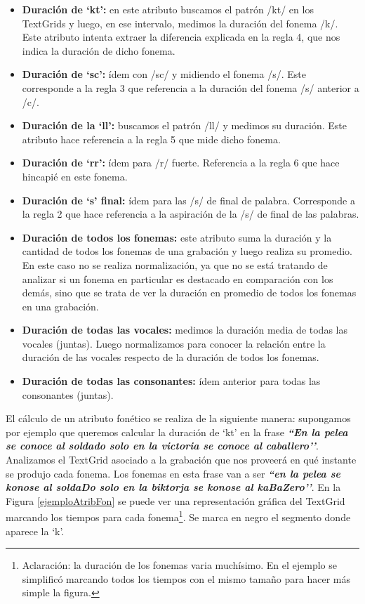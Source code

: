 \begin{itemize}
    \item \textbf{Duración de `kt’:} en este atributo buscamos el patrón /kt/ en los TextGrids y luego, en ese intervalo, medimos la duración del fonema /k/. Este atributo intenta extraer la diferencia explicada en la regla 4, que nos indica la duración de dicho fonema.
    \item \textbf{Duración de `sc’:} ídem con /sc/ y midiendo el fonema /s/. Este corresponde a la regla 3 que referencia a la duración del fonema /s/ anterior a /c/.  
    \item \textbf{Duración de la `ll’:} buscamos el patrón /ll/ y medimos su duración. Este atributo hace referencia a la regla 5 que mide dicho fonema.
    \item \textbf{Duración de `rr’:} ídem para /r/ fuerte. Referencia a la regla 6 que hace hincapié en este fonema.
    \item \textbf{Duración de `s’ final:} ídem para las /s/ de final de palabra. Corresponde a la regla 2 que hace referencia a la aspiración de la /s/ de final de las palabras.  
    \item \textbf{Duración de todos los fonemas:} este atributo suma la duración y la cantidad de todos los fonemas de una grabación y luego realiza su promedio. En este caso no se realiza normalización, ya que no se está tratando de analizar si un fonema en particular es destacado en comparación con los demás, sino que se trata de ver la duración en promedio de todos los fonemas en una grabación.
    \item \textbf{Duración de todas las vocales:} medimos la duración media de todas las vocales (juntas). Luego normalizamos para conocer la relación entre la duración de las vocales respecto de la duración de todos los fonemas.
    \item \textbf{Duración de todas las consonantes:} ídem anterior para todas las consonantes (juntas). 
\end{itemize}

El cálculo de un atributo fonético se realiza de la siguiente manera: supongamos por ejemplo que queremos calcular la duración de `kt’ en la frase \textbf{\textit{``En la pelea se conoce al soldado solo en la victoria se conoce al caballero’’}}. Analizamos el TextGrid asociado a la grabación que nos proveerá en qué instante se produjo cada fonema. Los fonemas en esta frase van a ser \textbf{\textit{``en la pelea se konose al soldaDo solo en la biktorja se konose al kaBaZero’’}}. En la Figura \ref{ejemploAtribFon} se puede ver una representación gráfica del TextGrid marcando los tiempos para cada fonema\footnote{Aclaración: la duración de los fonemas varia muchísimo. En el ejemplo se simplificó marcando todos los tiempos con el mismo tamaño para hacer más simple la figura.}. Se marca en negro el segmento donde aparece la `k’.

